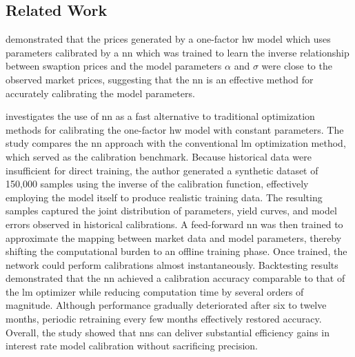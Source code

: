 \subsection{Related Work}
\textcite{alvarez2022hullwhite} demonstrated that the prices generated by a one-factor \ac{hw} model which uses parameters calibrated by a \ac{nn} which was trained to learn the inverse relationship between swaption prices and the model parameters $\alpha$ and $\sigma$ were close to the observed market prices, suggesting that the \ac{nn} is an effective method for accurately calibrating the model parameters.

\textcite{hernandez2016model} investigates the use of \ac{nn} as a fast alternative to traditional optimization methods for calibrating the one-factor \ac{hw} model with constant parameters. The study compares the \ac{nn} approach with the conventional \ac{lm} optimization method, which served as the calibration benchmark.
Because historical data were insufficient for direct training, the author generated a synthetic dataset of 150,000 samples using the inverse of the calibration function, effectively employing the model itself to produce realistic training data. The resulting samples captured the joint distribution of parameters, yield curves, and model errors observed in historical calibrations.
A feed-forward \ac{nn} was then trained to approximate the mapping between market data and model parameters, thereby shifting the computational burden to an offline training phase. Once trained, the network could perform calibrations almost instantaneously.
Backtesting results demonstrated that the \ac{nn} achieved a calibration accuracy comparable to that of the \ac{lm} optimizer while reducing computation time by several orders of magnitude. Although performance gradually deteriorated after six to twelve months, periodic retraining every few months effectively restored accuracy. Overall, the study showed that \ac{nn}s can deliver substantial efficiency gains in interest rate model calibration without sacrificing precision.

